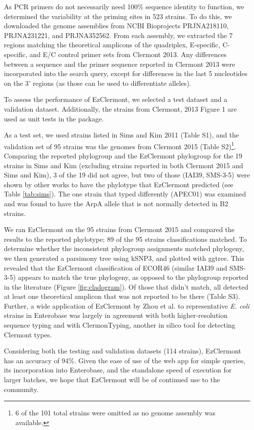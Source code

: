 As PCR primers do not necessarily need 100\% sequence identity to function, we determined the variability at the priming sites in 523 strains. To do this, we downloaded the genome assemblies from NCBI Bioprojects PRJNA218110, PRJNA231221, and PRJNA352562.  From each assembly, we extracted the 7 regions matching the theoretical amplicons of the quadriplex, E-specific, C-specific, and E/C control primer sets from Clermont 2013.  Any differences between a sequence and the primer sequence reported in Clermont 2013 were incorporated into the search query, except for differences in the last 5 nucleotides on the 3’ regions (as those can be used to differentiate alleles)\cite{Stadhouders2010}.

To assess the performance of EzClermont, we selected a test dataset and a validation dataset.  Additionally, the strains from Clermont, 2013 Figure 1 are used as unit tests in the package.

As a test set, we used strains listed in Sims and Kim 2011\cite{Sims2011} (Table S1), and the validation set of 95 strains was the genomes from Clermont 2015\cite{Denamur2015} (Table S2)\footnote{6 of the 101 total strains were omitted as no genome assembly was available.}.  Comparing the reported phylogroup and the EzClermont phylogroup for the 19 strains in Sims and Kim (excluding strains reported in both Clermont 2015 and Sims and Kim),  3 of the 19 did not agree, but two of those (IAI39, SMS-3-5) were shown by other works to have the phylotype that EzClermont predicted (see Table \ref{tab:sims}).  The one strain that typed differently (APEC01) was examined and was found to have the ArpA allele that is not normally detected in B2 strains.





We ran EzClermont on the 95 strains from Clermont 2015 and compared the results to the reported phylotype; 89 of the 95 strains classifications matched.  To determine whether the inconsistent phylogroup assignments matched phylogeny, we then generated a parsimony tree using kSNP3\cite{Gardner2015a}, and plotted with ggtree\cite{Yu2017a}. This revealed that the EzClermont classification of ECOR46 (similar IAI39 and SMS-3-5) appears to match the true phylogeny, as opposed to the phylogroup reported in the literature (Figure \ref{fig:cladogram}).  Of those that didn’t match, all detected at least one theoretical amplicon that was not reported to be there (Table S3). Further, a wide application of EzClermont by Zhou et al.\cite{zhou_users_2019} to representative \textit{E. coli}  strains in Enterobase was largely in agreement with both higher-resolution sequence typing and with ClermonTyping\cite{beghain_clermontyping:_2018}, another in silico tool for detecting Clermont types.





Considering both the testing and validation datasets (114 strains), EzClermont has an accuracy of 94\%. Given the ease of use of the web app for simple queries, its incorporation into Enterobase, and the standalone speed of execution for larger batches, we hope that EzClermont will be of continued use to the community.
